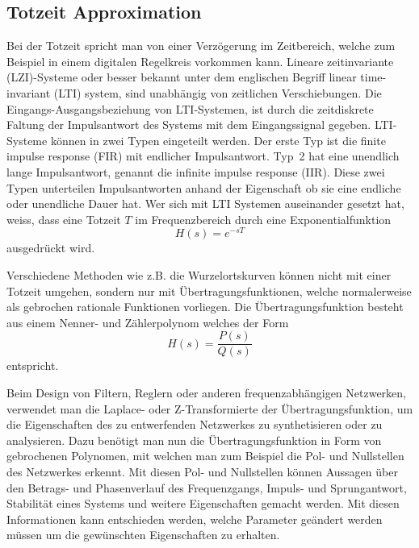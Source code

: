 \subsection{Totzeit Approximation
\label{pade:subsection:totzeit}}
%
%
%
%
%
Bei der Totzeit spricht man von einer Verzögerung im Zeitbereich, welche zum Beispiel in einem digitalen Regelkreis vorkommen kann.
Lineare zeitinvariante (LZI)-Systeme oder besser bekannt unter dem englischen Begriff linear time-invariant (LTI) system, sind unabhängig von zeitlichen Verschiebungen. 
%
%
%
Die Eingangs-Ausgangsbeziehung von LTI-Systemen, ist durch die
zeitdiskrete Faltung der Impulsantwort des Systems mit dem
Eingangssignal gegeben.
LTI-Systeme können in zwei Typen  eingeteilt werden.
Der erste Typ ist die finite impulse response (FIR) mit endlicher Impulsantwort.
%
%
%
%
Typ~2 hat eine unendlich lange Impulsantwort, genannt die infinite impulse response (IIR).
%
%
%
%
Diese zwei Typen unterteilen Impulsantworten anhand der Eigenschaft ob sie eine endliche oder unendliche Dauer hat. 
Wer sich mit LTI Systemen auseinander gesetzt hat, weiss, dass eine Totzeit $T$ im Frequenzbereich durch eine Exponentialfunktion
\begin{equation*}
H(s) = e^{-sT}
\end{equation*}
ausgedrückt wird.

Verschiedene Methoden wie z.B. die Wurzelortskurven können nicht mit einer Totzeit umgehen, sondern nur mit Übertragungsfunktionen, welche normalerweise als gebrochen rationale Funktionen vorliegen.
Die Übertragungsfunktion besteht aus einem Nenner- und Zählerpolynom welches der Form
\begin{equation*}
H(s)=\frac{P(s)}{Q(s)}
\end{equation*}
entspricht.

Beim Design von Filtern, Reglern oder anderen frequenzabhängigen Netzwerken, verwendet man die Laplace- oder Z-Transformierte der Übertragungsfunktion, um die Eigenschaften des zu entwerfenden Netzwerkes zu synthetisieren oder zu analysieren.
%
%
Dazu benötigt man nun die Übertragungsfunktion in Form von gebrochenen Polynomen, mit welchen man zum Beispiel die Pol- und Nullstellen des Netzwerkes erkennt.
Mit diesen Pol- und Nullstellen können Aussagen über den Betrags- und Phasenverlauf des Frequenzgangs, Impuls- und Sprungantwort, Stabilität eines Systems und weitere Eigenschaften gemacht werden.
%
%
%
%
%
Mit diesen Informationen kann entschieden werden, welche Parameter geändert werden müssen um die gewünschten Eigenschaften zu erhalten.
 
